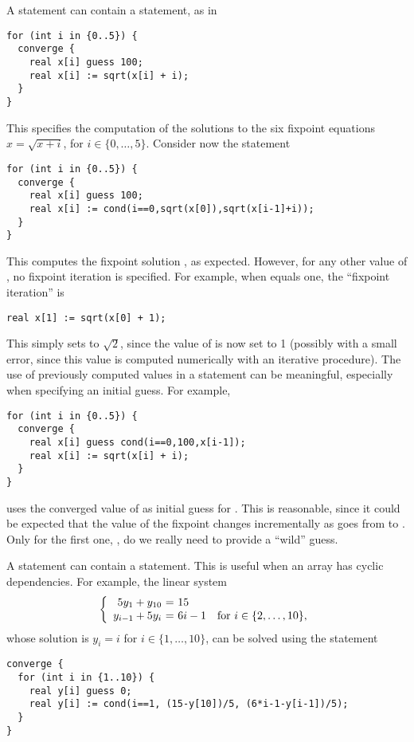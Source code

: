 A  statement can contain a  statement, as in
\begin{lstlisting}
for (int i in {0..5}) {
  converge {
    real x[i] guess 100;
    real x[i] := sqrt(x[i] + i);
  }
}
\end{lstlisting}
This specifies the computation of the solutions to the six fixpoint
equations $x = \sqrt{x+i}$, for $i \in \{0, \ldots, 5\}$.
Consider now the statement
\begin{lstlisting}
for (int i in {0..5}) {
  converge {
    real x[i] guess 100;
    real x[i] := cond(i==0,sqrt(x[0]),sqrt(x[i-1]+i));
  }
}
\end{lstlisting}
This computes the fixpoint solution , as expected.
However, for any other value of , no fixpoint iteration is
specified.  For example, when  equals one, the ``fixpoint
iteration'' is
\begin{lstlisting}
real x[1] := sqrt(x[0] + 1);
\end{lstlisting}
This simply sets  to $\sqrt{2}$, since the value of 
is now set to 1 (possibly with a small error, since this value is
computed numerically with an iterative procedure).
The use of previously computed values in a  statement
can be meaningful, especially when specifying an initial guess.
For example,
\begin{lstlisting}
for (int i in {0..5}) {
  converge {
    real x[i] guess cond(i==0,100,x[i-1]);
    real x[i] := sqrt(x[i] + i);
  }
}
\end{lstlisting}
uses the converged value of  as initial guess for .
This is reasonable, since it could be expected that the value of the
fixpoint changes incrementally as  goes from  to .
Only for the first one, , do we really need to provide a
``wild'' guess.

A  statement can contain a  statement.  This is
useful when an array has cyclic dependencies.
For example, the linear system 
$$
\left\{ \begin{array}{r @{~=~} l}
5y_1 + y_{10} &  15 \\
y_{i-1} + 5y_i & 6i-1  ~~~ \mbox{for}~  i \in \{2, \ldots, 10\} ,
\end{array} \right.
$$
whose solution is $y_i = i$ for $i \in \{1, \ldots, 10\}$,
can be solved using the statement
\begin{lstlisting}
converge {
  for (int i in {1..10}) {
    real y[i] guess 0;
    real y[i] := cond(i==1, (15-y[10])/5, (6*i-1-y[i-1])/5);
  }
}
\end{lstlisting}


